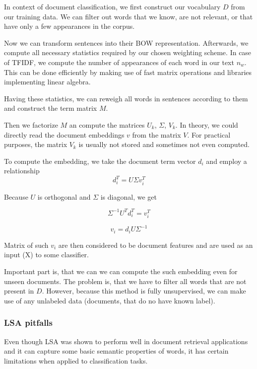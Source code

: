         In context of document classification, we first construct our vocabulary $D$ from our training data. 
        We can filter out words that we know, are not relevant, or that have only a few appearances in the corpus.
        
        Now we can transform sentences into their BOW representation.
        Afterwards, we compute all necessary statistics required by our chosen weighting scheme. 
        In case of TFIDF, we compute the number of appearances of each word in our text $n_w$. 
        This can be done efficiently by making use of fast matrix operations and libraries implementing linear algebra.
        
        Having these statistics, we can reweigh all words in sentences according to them and construct the term matrix $M$.
        
        Then we factorize $M$ an compute the matrices $U_k$, $\Sigma$, $V_k$. 
        In theory, we could directly read the document embeddings $v$ from the matrix $V$.
        For practical purposes, the matrix $V_k$ is usually not stored and sometimes not even computed. 
        
        To compute the embedding, we take the document term vector $d_i$ and employ a relationship $$d_i^T = U \Sigma v_i^T$$
        
        Because $U$ is orthogonal and $\Sigma$ is diagonal, we get
        
        $$\Sigma^{-1} U^T d_i^T = v_i^T $$

        $$v_i = d_i U \Sigma^{-1} $$
        
        Matrix of such $v_i$ are then considered to be document features and are used as an input (X) to some classifier.
        
        Important part is, that we can we can compute the such embedding even for unseen documents.
        The problem is, that we have to filter all words that are not present in $D$. 
        However, because this method is fully unsupervised, we can make use of any unlabeled data (documents, that do no have known label).
        
        \subsubsection{LSA pitfalls}

        Even though LSA was shown to perform well in document retrieval applications and it can capture some basic semantic properties of words,
        it has certain limitations when applied to classification tasks. 
        
